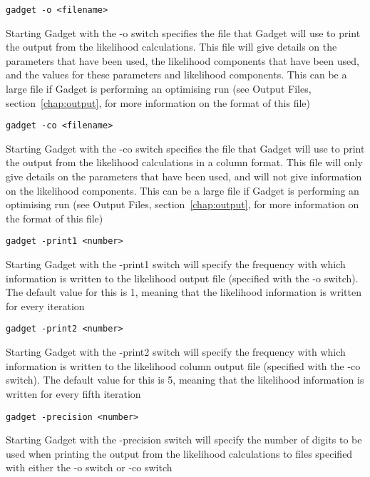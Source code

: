 \documentclass [a4paper, 10pt]{book}
\begin{document}
{\small\begin{verbatim}
gadget -o <filename>
\end{verbatim}}
Starting Gadget with the -o switch specifies the file that Gadget will use to print the output from the likelihood calculations.  This file will give details on the parameters that have been used, the likelihood components that have been used, and the values for these parameters and likelihood components.  This can be a large file if Gadget is performing an optimising run (see Output Files, section~\ref{chap:output}, for more information on the format of this file)

\newpage %
{\small\begin{verbatim}
gadget -co <filename>
\end{verbatim}}
Starting Gadget with the -co switch specifies the file that Gadget will use to print the output from the likelihood calculations in a column format.  This file will only give details on the parameters that have been used, and will not give information on the likelihood components.  This can be a large file if Gadget is performing an optimising run (see Output Files, section~\ref{chap:output}, for more information on the format of this file)

{\small\begin{verbatim}
gadget -print1 <number>
\end{verbatim}}
Starting Gadget with the -print1 switch will specify the frequency with which information is written to the likelihood output file (specified with the -o switch).  The default value for this is 1, meaning that the likelihood information is written for every iteration

{\small\begin{verbatim}
gadget -print2 <number>
\end{verbatim}}
Starting Gadget with the -print2 switch will specify the frequency with which information is written to the likelihood column output file (specified with the -co switch).  The default value for this is 5, meaning that the likelihood information is written for every fifth iteration

{\small\begin{verbatim}
gadget -precision <number>
\end{verbatim}}
Starting Gadget with the -precision switch will specify the number of digits to be used when printing the output from the likelihood calculations to files specified with either the -o switch or -co switch
\end{document}
